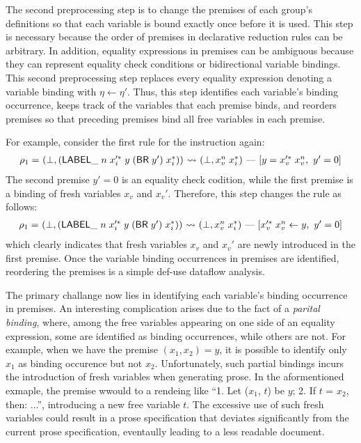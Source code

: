 \medskip
The second preprocessing step is to change the premises of each group's definitions
so that each variable is bound exactly once before it is used.
This step is necessary because the order of premises in declarative reduction rules
can be arbitrary.
In addition, equality expressions in premises can be ambiguous because they can represent equality check conditions or bidirectional variable bindings.
This second preprocessing step replaces every equality expression denoting a variable binding with $\eta \leftarrow \eta'$.
Thus, this step identifies each variable's binding occurrence,
keeps track of the variables that each premise binds,
and reorders premises so that preceding premises bind all free variables in each premise.

For example, consider the first rule for the  instruction again:
\[
\begin{array}{l@{~}l@{~}c@{~}l}
\rho_1 = &(\bot, (\ssf{LABEL\_} \; n \; x_i'^*\; y\; (\ssf{BR}\; y')\; x_i^*)) &\leadsto&
 (\bot, x_v^{n}\; x_i^*)\ \mbox{---}\ [y = x_v'^*\; x_v^{n},\ y' = 0]\\
\end{array}
\]
The second premise $y' = 0$ is an equality check codition,
while the first premise is a binding of fresh variables $x_v$ and $x_v'$.
Therefore, this step changes the rule as follows:
\[
\begin{array}{l@{~}l@{~}c@{~}l}
\rho_1 = &(\bot, (\ssf{LABEL\_} \; n \; x_i'^*\; y\; (\ssf{BR}\; y')\; x_i^*)) &\leadsto&
 (\bot, x_v^{n}\; x_i^*)\ \mbox{---}\ [x_v'^*\; x_v^{n} \leftarrow y,\ y' = 0]\\
\end{array}
\]
which clearly indicates that fresh variables $x_v$ and $x_v'$ are newly introduced in the first premise.
Once the variable binding occurrences in premises are identified,
reordering the premises is a simple def-use dataflow analysis.

The primary challange now lies in identifying each variable's binding occurrence in premises.
An interesting complication arises due to the fact of a \textit{parital
binding}, where, among the free variables appearing on one side of an equality
expression, some are identified as binding occurrences, while others are not.
For example, when we have the premise $(x_1, x_2) = y$, it is possible to
identify only $x_1$ as binding occurence but not $x_2$.
Unfortunately, such partial bindings incurs the introduction
of fresh variables when generating prose. In the aformentioned exmaple,
the premise wwould to a rendeing like ``1. Let ($x_1$, $t$) be $y$; 2. If $t$ =
$x_2$, then: ...'', introducing a new free variable $t$.  The excessive use of such
fresh variables could result in a prose specification that deviates significantly from the
current prose specification, eventaully leading to a less readable document.

